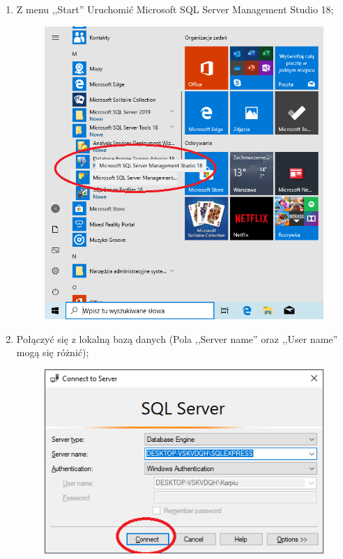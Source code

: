 \documentclass[12pt,a4paper]{article}
\begin{document}
\begin{enumerate}
\begin{figure}[H]
						\centering
					\end{figure}
				\item Z menu ,,Start'' Uruchomić Microsoft SQL Server Management Studio 18;
					\begin{figure}[H]
						\includegraphics[scale=0.4]{img/Local_Install_8.png}
						\centering
					\end{figure}		
				\item Połączyć się z lokalną bazą danych (Pola ,,Server name'' oraz ,,User name'' mogą się różnić);
					\begin{figure}[H]
						\includegraphics[scale=0.4]{img/Local_Install_9.png}

\end{figure}
\end{enumerate}
\end{document}
